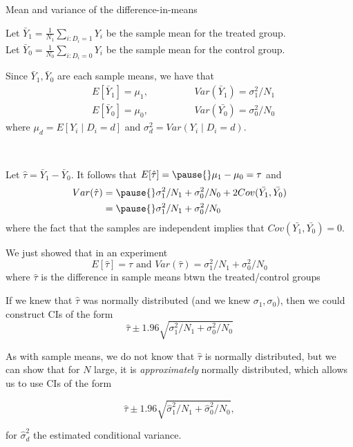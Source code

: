 \documentclass[11pt,english,handout]{beamer}
\newenvironment{wideitemize}{\itemize\addtolength{\itemsep}{10pt}}{\enditemize}
\begin{document}
\begin{frame}{Mean and variance of the difference-in-means}
\begin{wideitemize}
			\item
			Let $\bar{Y}_1 = \frac{1}{N_1} \sum_{i: D_i = 1}  Y_i $ be the sample mean for the treated group. \\
			Let $\bar{Y}_0 = \frac{1}{N_0} \sum_{i: D_i = 0}  Y_i $ be the sample mean for the control group. 
			
			\pause 
			\item
			Since $\bar{Y}_1,\bar{Y}_0$ are each sample means, we have that \pause 
			\begin{align*}
			& E[\bar{Y}_1] = \mu_1, \hspace{2cm} Var(\bar{Y}_1) = \sigma_1^2 / N_1 \\
			& E[\bar{Y}_0] = \mu_0, \hspace{2cm} Var(\bar{Y_0}) = \sigma_0^2 / N_0 
			\end{align*} 
		\noindent where $\mu_d = E[Y_i \mid D_i=d]$ and $\sigma_d^2 = Var(Y_i \mid D_i = d)$.
		
		\
		
			\item
			Let $\hat\tau= \bar{Y}_1 - \bar{Y}_0$. It follows that $E[\hat\tau] = \pause{}\mu_1 - \mu_0 = \tau$ and
			\begin{align*}
			Var( \hat\tau ) &=  \pause{} \sigma_1^2 / N_1 +  \sigma_0^2 / N_0 + 2 Cov(\bar{Y_1}, \bar{Y_0})\\
			& = \pause{}\sigma_1^2 / N_1 +  \sigma_0^2 / N_0 
					\end{align*}
			\noindent where the fact that the samples are independent implies that $Cov(\bar{Y_1}, \bar{Y_0}) = 0$.
\end{wideitemize}
\end{frame}

\begin{frame}
	\begin{wideitemize}
		\item
		We just showed that in an experiment $$E[\hat\tau] = \tau \text{ and } Var(\hat\tau) = \sigma_1^2/N_1 + \sigma_0^2 / N_0$$ where $\hat\tau$ is the difference in sample means btwn the treated/control groups
		
		\item
		If we knew that $\hat\tau$ was normally distributed (and we knew $\sigma_1,\sigma_0$), then we could construct CIs of the form \pause
		$$ \hat\tau \pm 1.96 \sqrt{\sigma_1^2/N_1 + \sigma_0^2 / N_0} $$
		
		\pause 
		\item
		As with sample means, we do not know that $\hat\tau$ is normally distributed, but we can show that for $N$ large, it is \emph{approximately} normally distributed, which allows us to use CIs of the form
		
		 $$ \hat\tau \pm 1.96 \sqrt{\hat\sigma_1^2/N_1 + \hat\sigma_0^2 / N_0} ,$$
		 
		 for $\hat\sigma_d^2$ the estimated conditional variance.
	\end{wideitemize}
\end{frame}
\end{document}
